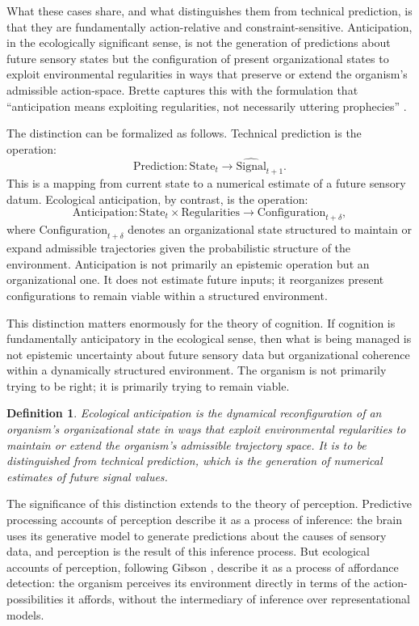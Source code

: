 \documentclass[12pt,a4paper]{report}
\theoremstyle{flyxion}
\newtheorem{definition}[theorem]{Definition}
\begin{document}
What these cases share, and what distinguishes them from technical prediction, is that they are fundamentally action-relative and constraint-sensitive. Anticipation, in the ecologically significant sense, is not the generation of predictions about future sensory states but the configuration of present organizational states to exploit environmental regularities in ways that preserve or extend the organism's admissible action-space. Brette captures this with the formulation that ``anticipation means exploiting regularities, not necessarily uttering prophecies'' \cite{brettepredictive}.

The distinction can be formalized as follows. Technical prediction is the operation:
\[
\text{Prediction} : \text{State}_t \rightarrow \hat{\text{Signal}}_{t+1}.
\]
This is a mapping from current state to a numerical estimate of a future sensory datum. Ecological anticipation, by contrast, is the operation:
\[
\text{Anticipation} : \text{State}_t \times \text{Regularities} \rightarrow \text{Configuration}_{t+\delta},
\]
where $\text{Configuration}_{t+\delta}$ denotes an organizational state structured to maintain or expand admissible trajectories given the probabilistic structure of the environment. Anticipation is not primarily an epistemic operation but an organizational one. It does not estimate future inputs; it reorganizes present configurations to remain viable within a structured environment.

This distinction matters enormously for the theory of cognition. If cognition is fundamentally anticipatory in the ecological sense, then what is being managed is not epistemic uncertainty about future sensory data but organizational coherence within a dynamically structured environment. The organism is not primarily trying to be right; it is primarily trying to remain viable.

\begin{definition}
\emph{Ecological anticipation} is the dynamical reconfiguration of an organism's organizational state in ways that exploit environmental regularities to maintain or extend the organism's admissible trajectory space. It is to be distinguished from \emph{technical prediction}, which is the generation of numerical estimates of future signal values.
\end{definition}

The significance of this distinction extends to the theory of perception. Predictive processing accounts of perception describe it as a process of inference: the brain uses its generative model to generate predictions about the causes of sensory data, and perception is the result of this inference process. But ecological accounts of perception, following Gibson \cite{gibson}, describe it as a process of affordance detection: the organism perceives its environment directly in terms of the action-possibilities it affords, without the intermediary of inference over representational models.
\end{document}
